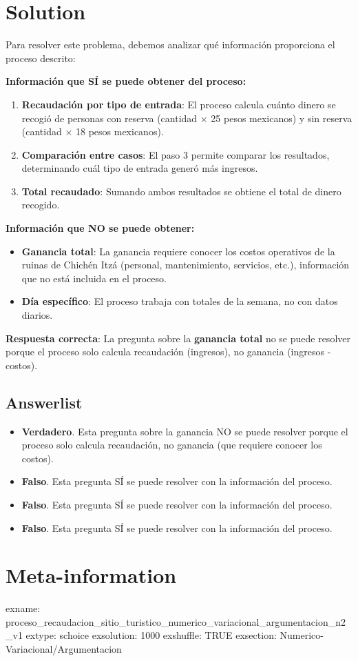 \documentclass[
]{article}
\providecommand{\tightlist}{%
  \setlength{\itemsep}{0pt}\setlength{\parskip}{0pt}}
\begin{document}
\section{Solution}\label{solution}

Para resolver este problema, debemos analizar qué información
proporciona el proceso descrito:

\textbf{Información que SÍ se puede obtener del proceso:}

\begin{enumerate}
\def\labelenumi{\arabic{enumi}.}
\item
  \textbf{Recaudación por tipo de entrada}: El proceso calcula cuánto
  dinero se recogió de personas con reserva (cantidad × 25 pesos
  mexicanos) y sin reserva (cantidad × 18 pesos mexicanos).
\item
  \textbf{Comparación entre casos}: El paso 3 permite comparar los
  resultados, determinando cuál tipo de entrada generó más ingresos.
\item
  \textbf{Total recaudado}: Sumando ambos resultados se obtiene el total
  de dinero recogido.
\end{enumerate}

\textbf{Información que NO se puede obtener:}

\begin{itemize}
\item
  \textbf{Ganancia total}: La ganancia requiere conocer los costos
  operativos de la ruinas de Chichén Itzá (personal, mantenimiento,
  servicios, etc.), información que no está incluida en el proceso.
\item
  \textbf{Día específico}: El proceso trabaja con totales de la semana,
  no con datos diarios.
\end{itemize}

\textbf{Respuesta correcta}: La pregunta sobre la \textbf{ganancia
total} no se puede resolver porque el proceso solo calcula recaudación
(ingresos), no ganancia (ingresos - costos).

\subsection{Answerlist}\label{answerlist-1}

\begin{itemize}
\tightlist
\item
  \textbf{Verdadero}. Esta pregunta sobre la ganancia NO se puede
  resolver porque el proceso solo calcula recaudación, no ganancia (que
  requiere conocer los costos).
\item
  \textbf{Falso}. Esta pregunta SÍ se puede resolver con la información
  del proceso.
\item
  \textbf{Falso}. Esta pregunta SÍ se puede resolver con la información
  del proceso.
\item
  \textbf{Falso}. Esta pregunta SÍ se puede resolver con la información
  del proceso.
\end{itemize}

\section{Meta-information}\label{meta-information}

exname:
proceso\_recaudacion\_sitio\_turistico\_numerico\_variacional\_argumentacion\_n2\_v1
extype: schoice exsolution: 1000 exshuffle: TRUE exsection:
Numerico-Variacional/Argumentacion
\end{document}
